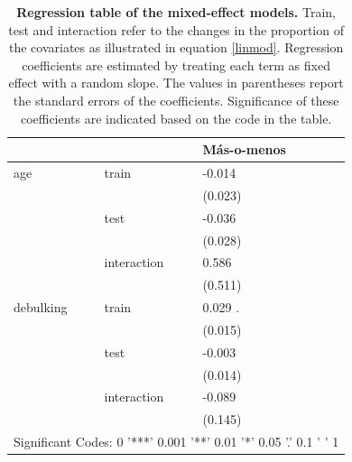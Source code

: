 \documentclass{bioinfo}
\begin{document}
\begin{table}[htbp]
\begin{tabular}{llll}
    \hline
          &       & M\'{a}s-o-menos &  \\
    \hline
    age   & train & -0.014 &  \\
          &       & (0.023) &  \\
          & test  & -0.036 &  \\
          &       & (0.028) &  \\
          & interaction & 0.586 &  \\
          &       & (0.511) &  \\
    debulking & train & 0.029 . &  \\
          &       & (0.015) &  \\
          & test  & -0.003 &  \\
          &       & (0.014) &  \\
          & interaction & -0.089 &  \\
          &       & (0.145) &  \\
	\hline    
    \multicolumn{4}{c}{Significant Codes: 0 '***' 0.001 '**' 0.01 '*' 0.05 '.' 0.1 ' ' 1} \\
    \bottomrule
    \end{tabular}%
  \caption{\textbf{Regression table of the mixed-effect models.} Train, test and interaction refer to the changes in the proportion of the covariates as illustrated in equation \ref{linmod}. Regression coefficients are estimated by treating each term as fixed effect with a random slope. The values in parentheses report the standard errors of the coefficients. Significance of these coefficients are indicated based on the code in the table.}
  \label{regress-table}%
\end{table}%
\end{document}
